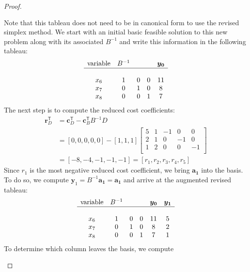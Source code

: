 \documentclass[12pt]{article}
\theoremstyle{definition}
\newcommand{\vect}[1]{\boldsymbol{#1}}
\newcommand{\tran}{\mathsf{T}}
\begin{document}
\begin{proof}
\begin{enumerate}
      Note that this tableau does not need to be in canonical form to use the revised
      simplex method. We start with an initial basic feasible solution to this new problem
      along with its associated $B^{-1}$ and write this information in the following tableau:
      \begin{align*}
        \begin{matrix}
          \text{variable} & B^{-1} & & & \vect{y_0} \\
          \hline \\
          x_6 & 1 & 0 & 0 & 11 \\
          x_7 & 0 & 1 & 0 & 8  \\
          x_8 & 0 & 0 & 1 & 7  \\
        \end{matrix}
      \end{align*}
      The next step is to compute the reduced cost coefficients:
      \begin{align*}
        \vect{r}_D^\tran &= \vect{c}_D^\tran - \vect{c}_B^\tran B^{-1} D \\
        &= [0, 0, 0, 0, 0] - [1, 1, 1]
        \begin{bmatrix}
          5 & 1 & -1 & 0 & 0 \\
          2 & 1 & 0 & -1 & 0 \\
          1 & 2 & 0 & 0 & -1 \\
        \end{bmatrix} \\
        &= [-8, -4, -1, -1, -1] = [r_1, r_2, r_3, r_4, r_5]
      \end{align*}
      Since $r_1$ is the most negative reduced cost coefficient, we bring $\vect{a_1}$ into the basis.
      To do so, we compute $\vect{y}_1 = B^{-1}\vect{a_1} = \vect{a_1}$ and arrive
      at the augmented revised tableau:
      \begin{align*}
        \begin{matrix}
          \text{variable} & B^{-1} & & & \vect{y_0} & \vect{y_1} \\
          \hline \\
          x_6 & 1 & 0 & 0 & 11 & 5 \\
          x_7 & 0 & 1 & 0 & 8 & 2 \\
          x_8 & 0 & 0 & 1 & 7 & 1 \\
        \end{matrix}
      \end{align*}
      To determine which column leaves the basis, we compute

\end{enumerate}
\end{proof}
\end{document}
